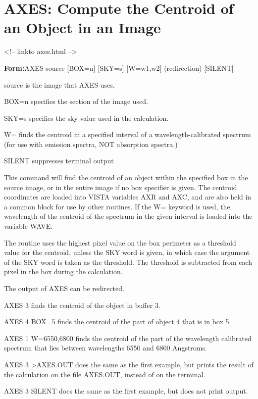 \section{AXES: Compute the Centroid of an Object in an Image}
\begin{rawhtml}
<!-- linkto axes.html -->
\end{rawhtml}
\begin{command}
  \item[\textbf{Form:}AXES source {[BOX=n]} {[SKY=s]} {[W=w1,w2]} (redirection) {[SILENT]}\hfill]{}
  \item[source\hfill]{is the image that AXES uses.}
  \item[BOX=n\hfill]{specifies the section of the image used.}
  \item[SKY=s\hfill]{specifies the sky value used in the calculation.}
  \item[W=\hfill]{finds the centroid in a specified interval
of a wavelength-calibrated spectrum (for use
with emission spectra, NOT absorption spectra.)}
  \item[SILENT \hfill]{suppresses terminal output}
\end{command}

This command will find the centroid of an object within the specified box
in the source image, or in the entire image if no box specifier is
given. The centroid coordinates are loaded into VISTA variables AXR and
AXC, and are also held in a common block for use by other routines.  If the
W= keyword is used, the wavelength of the centroid of the spectrum in the
given interval is loaded into the variable WAVE.

The routine uses the highest pixel value on the box perimeter as a
threshold value for the centroid, unless the SKY word is given, in which
case the argument of the SKY word is taken as the threshold.  The threshold
is subtracted from each pixel in the box during the calculation.

The output of AXES can be redirected.

\begin{example}
  \item[AXES 3\hfill]{finds the centroid of the object in buffer 3.}
  \item[AXES 4 BOX=5\hfill]{finds the centroid of the part of
       object 4 that is in box 5.}
  \item[AXES 1 W=6550,6800\hfill]{finds the centroid of the part of
       the wavelength calibrated spectrum that lies between wavelengths 6550
       and 6800 Angstroms.}
  \item[AXES 3 >AXES.OUT\hfill]{does the same as the first example,
       but prints the result of the calculation on the file AXES.OUT, 
       instead of on the terminal.}
  \item[AXES 3 SILENT\hfill]{does the same as the first example,
       but does not print output.}
\end{example}
